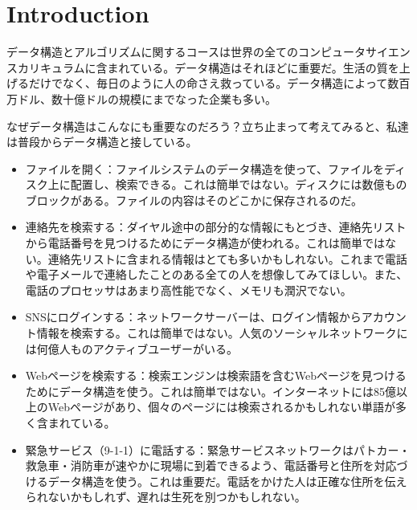 \chapter{Introduction}

データ構造とアルゴリズムに関するコースは世界の全てのコンピュータサイエンスカリキュラムに含まれている。データ構造はそれほどに重要だ。生活の質を上げるだけでなく、毎日のように人の命さえ救っている。データ構造によって数百万ドル、数十億ドルの規模にまでなった企業も多い。

なぜデータ構造はこんなにも重要なのだろう？立ち止まって考えてみると、私達は普段からデータ構造と接している。

\begin{itemize}
	\item ファイルを開く：ファイルシステムのデータ構造を使って、ファイルをディスク上に配置し、検索できる。これは簡単ではない。ディスクには数億ものブロックがある。ファイルの内容はそのどこかに保存されるのだ。
	\item 連絡先を検索する：ダイヤル途中の部分的な情報にもとづき、連絡先リストから電話番号を見つけるためにデータ構造が使われる。これは簡単ではない。連絡先リストに含まれる情報はとても多いかもしれない。これまで電話や電子メールで連絡したことのある全ての人を想像してみてほしい。また、電話のプロセッサはあまり高性能でなく、メモリも潤沢でない。
	\item SNSにログインする：ネットワークサーバーは、ログイン情報からアカウント情報を検索する。これは簡単ではない。人気のソーシャルネットワークには何億人ものアクティブユーザーがいる。
	\item Webページを検索する：検索エンジンは検索語を含むWebページを見つけるためにデータ構造を使う。これは簡単ではない。インターネットには85億以上のWebページがあり、個々のページには検索されるかもしれない単語が多く含まれている。
	\item 緊急サービス（9-1-1）に電話する：緊急サービスネットワークはパトカー・救急車・消防車が速やかに現場に到着できるよう、電話番号と住所を対応づけるデータ構造を使う。これは重要だ。電話をかけた人は正確な住所を伝えられないかもしれず、遅れは生死を別つかもしれない。
\end{itemize}

